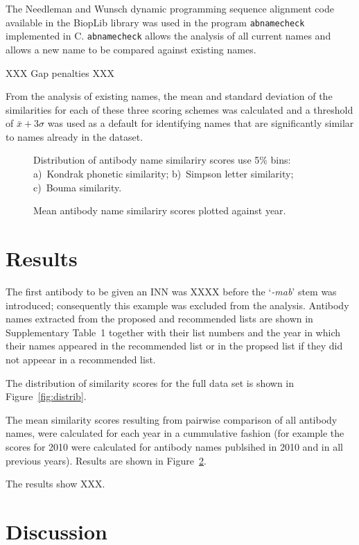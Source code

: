 \documentclass{article}
\newcommand{\eg}[1]{`\emph{#1}'}
\begin{document}
The Needleman and Wunsch dynamic programming sequence alignment code
available in the BiopLib\cite{porter:bioplib} library was used in the
program \verb|abnamecheck| implemented in C. \verb|abnamecheck| allows
the analysis of all current names and allows a new name to be compared
against existing names.

XXX Gap penalties XXX

From the analysis of existing names, the mean and standard deviation
of the similarities for each of these three scoring schemes was
calculated and a threshold of $\bar{x} + 3\sigma$ was used as a
default for identifying names that are significantly similar to names
already in the dataset.

\begin{figure}
%
%
  \caption{\label{fig:results} Distribution of antibody name similariry
    scores use 5\% bins: a)~Kondrak phonetic similarity; b)~Simpson
    letter similarity; c)~Bouma similarity.}
\end{figure}

\begin{figure}
  \caption{\label{fig:results} Mean antibody name similariry
    scores plotted against year.}
\end{figure}

\section{Results}
The first antibody to be given an INN was XXXX before the \eg{-mab}
stem was introduced; consequently this example was excluded from the
analysis. Antibody names extracted from the proposed and recommended
lists are shown in Supplementary Table~1 together with their list
numbers and the year in which their names appeared in the recommended
list or in the propsed list if they did not appeear in a recommended
list.

The distribution of similarity scores for the full data set is shown in
Figure~\ref{fig:distrib}. 

The mean similarity scores resulting from pairwise comparison of all
antibody names, were calculated for each year in a cummulative fashion
(for example the scores for 2010 were calculated for antibody names
publsihed in 2010 and in all previous years). Results are shown in
Figure~\ref{fig:results}. 

The results show XXX.

\section{Discussion}



\end{document}
